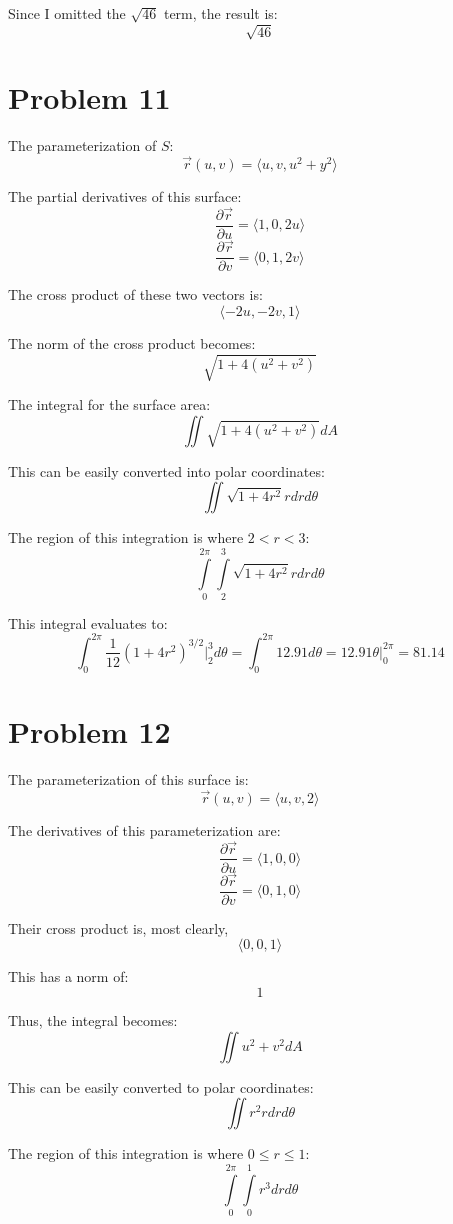 \documentclass{article}
\begin{document}
Since I omitted the $\sqrt{46}$ term, the result is:
$$ \sqrt{46} $$

\section*{Problem 11}

The parameterization of $S$:
$$ \vec{r}(u,v) = \langle u, v, u^2 + y^2 \rangle $$

The partial derivatives of this surface:
$$ \frac{\partial \vec{r}}{\partial u} = \langle 1, 0, 2u \rangle $$
$$ \frac{\partial \vec{r}}{\partial v} = \langle 0, 1, 2v \rangle $$

The cross product of these two vectors is:
$$ \langle -2u, -2v, 1 \rangle $$

The norm of the cross product becomes:
$$ \sqrt{1 + 4 (u^2 + v^2)} $$

The integral for the surface area:
$$ \iint \sqrt{1 + 4(u^2 + v^2)} dA $$

This can be easily converted into polar coordinates:
$$ \iint \sqrt{1 + 4r^2} r dr d\theta $$

The region of this integration is where $2 < r < 3$:
$$ \int\limits_0^{2\pi}\int\limits_2^3 \sqrt{1 + 4r^2} r dr d\theta $$

This integral evaluates to:
$$ \int_0^{2\pi} \frac{1}{12} (1 + 4r^2)^{3/2} \bigg\vert_2^3 d\theta =
\int_0^{2\pi} 12.91 d\theta = 12.91 \theta \bigg\vert_0^{2\pi} = 81.14 $$

\section*{Problem 12}

The parameterization of this surface is:
$$ \vec{r}(u,v) = \langle u, v, 2 \rangle $$

The derivatives of this parameterization are:
$$ \frac{\partial \vec{r}}{\partial u} = \langle 1, 0, 0 \rangle $$
$$ \frac{\partial \vec{r}}{\partial v} = \langle 0, 1, 0 \rangle $$

Their cross product is, most clearly,
$$ \langle 0, 0, 1 \rangle $$

This has a norm of:
$$ 1 $$

Thus, the integral becomes:
$$ \iint u^2 + v^2 dA $$

This can be easily converted to polar coordinates:
$$ \iint r^2 r dr d\theta $$

The region of this integration is where $ 0 \leq r \leq 1$:
$$ \int\limits_0^{2\pi}\int\limits_0^1 r^3 dr d\theta $$
\end{document}

